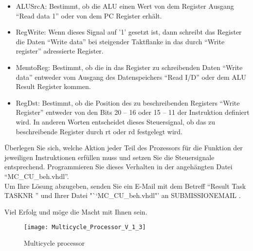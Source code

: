 \documentclass[a4paper,12pt]{article}
\begin{document}
\begin{itemize}
\item{ALUSrcA: Bestimmt, ob die ALU einen Wert von dem Register Ausgang "`Read data 1"' oder von dem PC Register erh\"alt.}

\item{RegWrite: Wenn dieses Signal auf '1' gesetzt ist, dann schreibt das Register die Daten "`Write data"' bei steigender Taktflanke in das durch "`Write register"' adressierte Register.}

\item{MemtoReg: Bestimmt, ob die in das Register zu schreibenden Daten "`Write data"' entweder vom Ausgang des Datenspeichers "`Read I/D"' oder dem ALU Result Register kommen.}

\item{RegDst: Bestimmt, ob die Position des zu beschreibenden Registers "`Write Register"' entweder von den Bits 20 -- 16 oder 15 -- 11 der Instruktion definiert wird. In anderen Worten entscheidet dieses Steuersignal, ob das zu beschreibende Register durch rt oder rd festgelegt wird.}

\end{itemize}

\"Uberlegen Sie sich, welche Aktion jeder Teil des Prozessors f\"ur die Funktion der jeweiligen Instruktionen erf\"ullen muss und setzen Sie die Steuersignale entsprechend. Programmieren Sie dieses Verhalten in der angeh\"angten Datei "`MC\_CU\_beh.vhdl"'.\\

Um Ihre L\"osung abzugeben, senden Sie ein E-Mail mit dem Betreff "`Result Task {{ TASKNR }}"' und Ihrer Datei "``MC\_CU\_beh.vhdl"'  an {{ SUBMISSIONEMAIL }}.

\vspace{0.7cm}
Viel Erfolg und m\"oge die Macht mit Ihnen sein.


\begin{landscape}
\begin{figure}[!h]
\vspace{-1cm}
\hspace{-1.8cm}
\texttt{[image: Multicycle\_Processor\_V\_1\_3]}
\caption{Multicycle processor}
\label{fig:MulticycleProcessor}
\end{figure}
\end{landscape}
\end{document}
